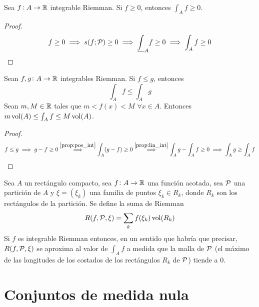 \begin{prop}[Positividad]\label{prop:pos_int}
    Sea $f \colon A \to \mathbb{R}$ integrable Riemman. Si $f \geq 0$, entonces
    $\int_A f \geq 0$.
\end{prop}
\begin{proof}
    \[
        f \geq 0 \implies s(f;\mathcal{P}) \geq 0 \implies \underline{\int}_A f \geq 0
        \implies \int_A f \geq 0
    \]
\end{proof}

\begin{col}
    Sean $f,g \colon A \to \mathbb{R}$ integrables Riemman. Si $f \leq g$, entonces
    \[
        \int_A f \leq \int_A g
    \]
    Sean $m,M \in \mathbb{R}$ tales que $m < f(x) < M$ $\forall x \in A$. Entonces
    $m\operatorname{vol}(A) \leq \int_A f \leq M\operatorname{vol}(A)$.
\end{col}

\begin{proof}
    \[
        f \leq g \implies g - f \geq 0 \stackrel{\ref{prop:pos_int}}{\implies}
        \int_A (g-f) \geq 0 \stackrel{\ref{prop:lin_int}}{\implies} \int_A g -
        \int_A f \geq 0 \implies \int_A g \geq \int_A f
    \]
\end{proof}

\begin{prop}
    Sea $A$ un rectángulo compacto, sea $f \colon A \to \mathbb{R}$ una función acotada,
    sea $\mathcal{P}$ una partición de $A$ y $\xi = \left(\xi_k\right)$ una familia de
    puntos $\xi_k \in R_k$, donde $R_k$ son los rectángulos de la partición. Se
    define la suma de Riemman
    \[
        R(f,\mathcal{P},\xi) = \sum_k f(\xi_k)\operatorname{vol}(R_k) 
    \]
    Si $f$ es integrable Riemman entonces, en un sentido que habría que precisar,
    $R(f,\mathcal{P},\xi)$ se aproxima al valor de $\int_A f$ a medida que la malla de
    $\mathcal{P}$ (el máximo de las longitudes de los costados de los rectángulos $R_k$ de
    $\mathcal{P}$) tiende a 0.
\end{prop}

\section{Conjuntos de medida nula}


